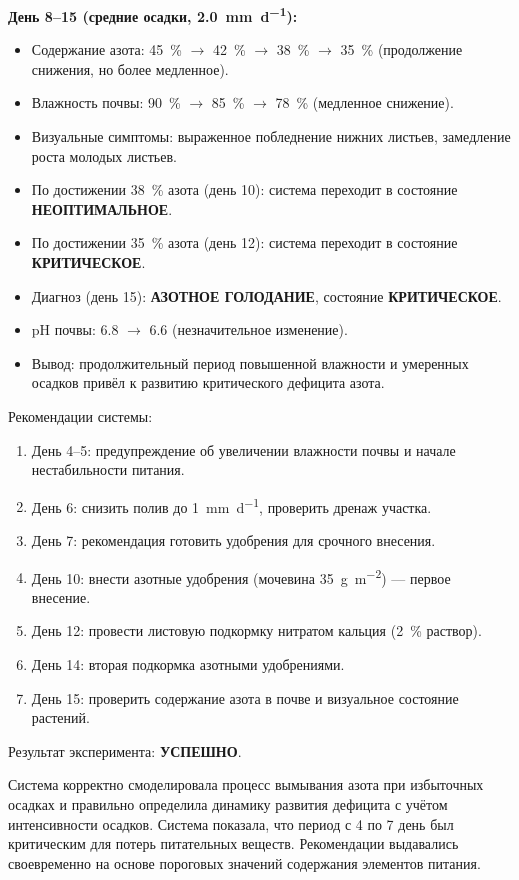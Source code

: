 \textbf{День 8--15 (средние осадки, \SI{2.0}{\mm\per\day}):}
\begin{itemize}
    \item Содержание азота: \SI{45}{\percent} $\to$ \SI{42}{\percent} $\to$ \SI{38}{\percent} $\to$ \SI{35}{\percent} (продолжение снижения, но более медленное).
    \item Влажность почвы: \SI{90}{\percent} $\to$ \SI{85}{\percent} $\to$ \SI{78}{\percent} (медленное снижение).
    \item Визуальные симптомы: выраженное побледнение нижних листьев, замедление роста молодых листьев.
    \item По достижении \SI{38}{\percent} азота (день \num{10}): система переходит в состояние \textbf{НЕОПТИМАЛЬНОЕ}.
    \item По достижении \SI{35}{\percent} азота (день \num{12}): система переходит в состояние \textbf{КРИТИЧЕСКОЕ}.
    \item Диагноз (день \num{15}): \textbf{АЗОТНОЕ ГОЛОДАНИЕ}, состояние \textbf{КРИТИЧЕСКОЕ}.
    \item pH почвы: \num{6.8} $\to$ \num{6.6} (незначительное изменение).
    \item Вывод: продолжительный период повышенной влажности и умеренных осадков привёл к развитию критического дефицита азота.
\end{itemize}

Рекомендации системы:
\begin{enumerate}
    \item День 4--5: предупреждение об увеличении влажности почвы и начале нестабильности питания.
    \item День 6: снизить полив до \SI{1}{\mm\per\day}, проверить дренаж участка.
    \item День 7: рекомендация готовить удобрения для срочного внесения.
    \item День 10: внести азотные удобрения (мочевина \SI{35}{\gram\per\square\meter}) --- первое внесение.
    \item День 12: провести листовую подкормку нитратом кальция (\SI{2}{\percent} раствор).
    \item День 14: вторая подкормка азотными удобрениями.
    \item День 15: проверить содержание азота в почве и визуальное состояние растений.
\end{enumerate}

Результат эксперимента: \textbf{УСПЕШНО}.

Система корректно смоделировала процесс вымывания азота при избыточных осадках и правильно определила динамику развития дефицита с учётом интенсивности осадков. Система показала, что период с \num{4} по \num{7} день был критическим для потерь питательных веществ. Рекомендации выдавались своевременно на основе пороговых значений содержания элементов питания.


